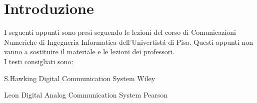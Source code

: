 \section{Introduzione}
I seguenti appunti sono presi seguendo le lezioni del corso di Comunicazioni Numeriche 
di Ingegneria Informatica dell'Univertistá di Pisa. Questi appunti non 
vanno a sostituire il materiale e le lezioni dei professori.\\
I testi consigliati sono:

S.Hawking Digital Communication System Wiley


Leon Digital Analog Communication System Pearson

